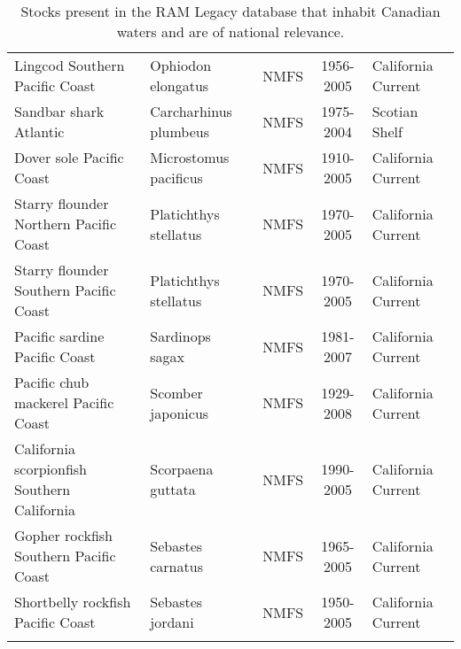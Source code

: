 \begin{longtable}{p{4cm}p{3.5cm}ccp{5.5cm}}
  Lingcod Southern Pacific Coast & Ophiodon elongatus & NMFS & 1956-2005 & California Current \\ 
  Sandbar shark Atlantic & Carcharhinus plumbeus & NMFS & 1975-2004 & Scotian Shelf \\ 
  Dover sole Pacific Coast & Microstomus pacificus & NMFS & 1910-2005 & California Current \\ 
  Starry flounder Northern Pacific Coast & Platichthys stellatus & NMFS & 1970-2005 & California Current \\ 
  Starry flounder Southern Pacific Coast & Platichthys stellatus & NMFS & 1970-2005 & California Current \\ 
  Pacific sardine Pacific Coast & Sardinops sagax & NMFS & 1981-2007 & California Current \\ 
  Pacific chub mackerel Pacific Coast & Scomber japonicus & NMFS & 1929-2008 & California Current \\ 
  California scorpionfish Southern California & Scorpaena guttata & NMFS & 1990-2005 & California Current \\ 
  Gopher rockfish Southern Pacific Coast & Sebastes carnatus & NMFS & 1965-2005 & California Current \\ 
  Shortbelly rockfish Pacific Coast & Sebastes jordani & NMFS & 1950-2005 & California Current \\ 
   \hline
\hline
\caption{Stocks present in the RAM Legacy database that inhabit Canadian waters and are of national relevance.}
\label{tab:crosshair}
\end{longtable}
